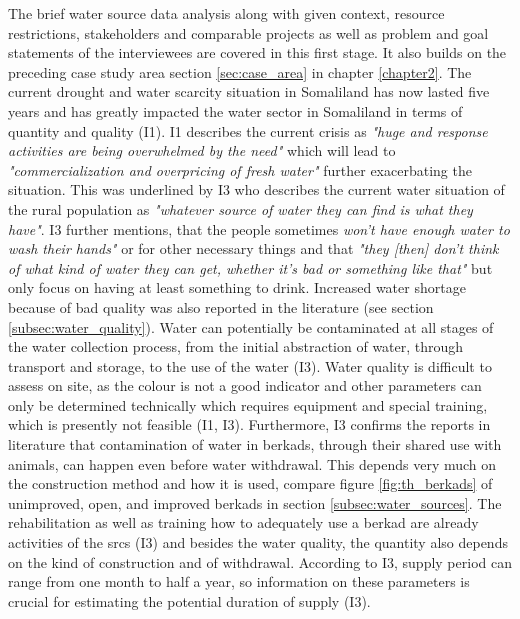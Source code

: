 The brief water source data analysis along with given context, resource restrictions, stakeholders and comparable projects as well as problem and goal statements of the interviewees are covered in this first stage. It also builds on the preceding case study area section \ref{sec:case_area} in chapter \ref{chapter2}.\newline
The current drought and water scarcity situation in Somaliland has now lasted five years and has greatly impacted the water sector in Somaliland in terms of quantity and quality (I1). I1 describes the current crisis as \textit{"huge and response activities are being overwhelmed by the need"} which will lead to \textit{"commercialization and overpricing of fresh water"} further exacerbating the situation. This was underlined by I3 who describes the current water situation of the rural population as \textit{"whatever source of water they can find is what they have"}. I3 further mentions, that the people sometimes \textit{won't have enough water to wash their hands"} or for other necessary things and that \textit{"they [then] don't think of what kind of water they can get, whether it's bad or something like that"} but only focus on having at least something to drink. Increased water shortage because of bad quality was also reported in the literature (see section \ref{subsec:water_quality}). Water can potentially be contaminated at all stages of the water collection process, from the initial abstraction of water, through transport and storage, to the use of the water (I3). Water quality is difficult to assess on site, as the colour is not a good indicator and other parameters can only be determined technically which requires equipment and special training, which is presently not feasible (I1, I3). Furthermore, I3 confirms the reports in literature that contamination of water in berkads, through their shared use with animals, can happen even before water withdrawal. This depends very much on the construction method and how it is used, compare figure \ref{fig:th_berkads} of unimproved, open, and improved berkads in section \ref{subsec:water_sources}. The rehabilitation as well as training how to adequately use a berkad are already activities of the \acrshort{srcs} (I3) and besides the water quality, the quantity also depends on the kind of construction and of withdrawal. According to I3, supply period can range from one month to half a year, so information on these parameters is crucial for estimating the potential duration of supply (I3).\newline

